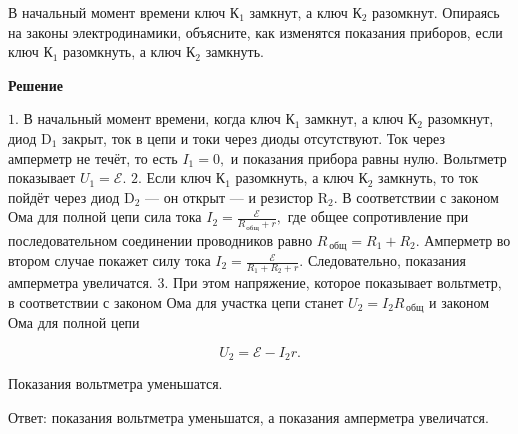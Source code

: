 \documentclass[12pt,a4paper]{article}
\begin{document}
{В начальный момент времени ключ К$_{1}$ замкнут, а ключ К$_{2}$ разомкнут. Опираясь на законы электродинамики, объясните, как изменятся показания приборов, если ключ К$_{1}$ разомкнуть, а ключ К$_{2}$ замкнуть.
}{
\smallskip\noindent\textbf{Решение}\par
$1$.  В начальный момент времени, когда ключ К$_{1}$ замкнут, а ключ К$_{2}$ разомкнут, диод D$_{1}$ закрыт, ток в цепи и токи через диоды отсутствуют. Ток через амперметр не течёт, то есть $I_1 = 0,$ и показания прибора равны нулю. Вольтметр показывает $U_1 = \mathcal{E}.$
$2$.  Если ключ К$_{1}$ разомкнуть, а ключ К$_{2}$ замкнуть, то ток пойдёт через диод D$_{2}$  — он открыт  — и резистор R$_{2}$. В соответствии с законом Ома для полной цепи сила тока $I_2 = \frac{\mathcal{E}}{R_{\,\text{общ}} + r} ,$ где общее сопротивление при последовательном соединении проводников равно $R_{\,\text{общ}}=R_1 + R_2.$ Амперметр во втором случае покажет силу тока $I_2 = \frac{\mathcal{E}}{R_1 + R_2 + r} .$ Следовательно, показания амперметра увеличатся.
$3$.  При этом напряжение, которое показывает вольтметр, в соответствии с законом Ома для участка цепи станет $U_2 = I_2R_{\,\text{общ}}$ и законом Ома для полной цепи

\[U_2 = \mathcal{E} - I_2 r.\]

 Показания вольтметра уменьшатся.

Ответ: показания вольтметра уменьшатся, а показания амперметра увеличатся.
}
\end{document}

